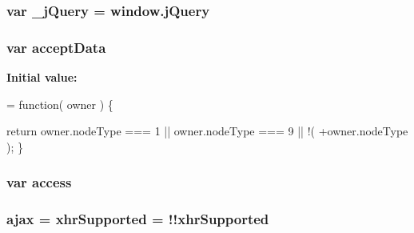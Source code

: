\subsubsection[{\texorpdfstring{\+\_\+j\+Query}{_jQuery}}]{\setlength{\rightskip}{0pt plus 5cm}var \+\_\+j\+Query = {\bf window.\+j\+Query}}\hypertarget{jquery-3_82_81_8js_aceac666b46ac9e54a243817d92e9bb13}{}\label{jquery-3_82_81_8js_aceac666b46ac9e54a243817d92e9bb13}
\subsubsection[{\texorpdfstring{accept\+Data}{acceptData}}]{\setlength{\rightskip}{0pt plus 5cm}var accept\+Data}\hypertarget{jquery-3_82_81_8js_ad857b8908b77daaf4e86a8c0fbce6edc}{}\label{jquery-3_82_81_8js_ad857b8908b77daaf4e86a8c0fbce6edc}
{\bfseries Initial value\+:}
\begin{DoxyCode}
= \textcolor{keyword}{function}( owner ) \{

    
    
    
    
    
    
    \textcolor{keywordflow}{return} owner.nodeType === 1 || owner.nodeType === 9 || !( +owner.nodeType );
\}
\end{DoxyCode}
\subsubsection[{\texorpdfstring{access}{access}}]{\setlength{\rightskip}{0pt plus 5cm}var access}\hypertarget{jquery-3_82_81_8js_a4d22b5410118180ad16b385db5db0d0f}{}\label{jquery-3_82_81_8js_a4d22b5410118180ad16b385db5db0d0f}
\subsubsection[{\texorpdfstring{ajax}{ajax}}]{ ajax = {\bf xhr\+Supported} = !!{\bf xhr\+Supported}}\hypertarget{jquery-3_82_81_8js_af45afceed06e4a3422005112719633dd}{}\label{jquery-3_82_81_8js_af45afceed06e4a3422005112719633dd}

